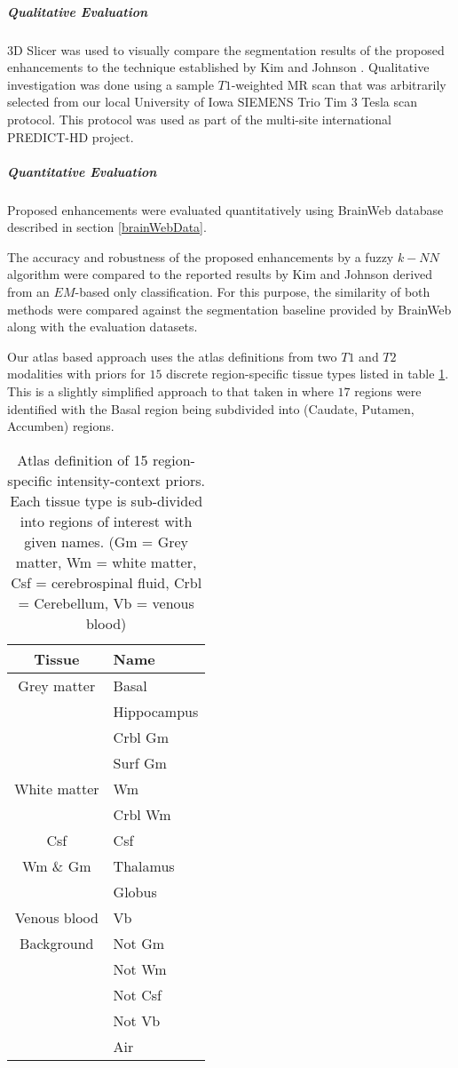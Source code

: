 \subparagraph{Qualitative Evaluation} %

3D Slicer \cite{slicer_paper} was used to visually compare the segmentation results of the proposed enhancements to the technique established by Kim and Johnson \cite{Kim2013}. 
Qualitative investigation was done using a sample $T1$-weighted MR scan that was arbitrarily selected from our local University of Iowa SIEMENS Trio Tim $3$ Tesla scan protocol.  This protocol was used as part of the multi-site international PREDICT-HD \cite{PREDICTHD} project.

\subparagraph{Quantitative Evaluation} %

Proposed enhancements were evaluated quantitatively using BrainWeb database described in section \ref{brainWebData}.

The accuracy and robustness of the proposed enhancements by a fuzzy $k-NN$ algorithm were compared to the reported results by Kim and Johnson \cite{Kim2013} derived from an $EM$-based only classification. For this purpose, the similarity of both methods were compared against the segmentation baseline provided by BrainWeb along with the evaluation datasets.

Our atlas based approach uses the atlas definitions from two $T1$ and $T2$ modalities with priors for $15$ discrete region-specific tissue types listed in table \ref{tab:tissue_names}. This is a slightly simplified approach to that taken in \cite{Kim2013} where $17$ regions were identified with the Basal region being subdivided into (Caudate, Putamen, Accumben) regions.
\begin{table}
\centering
\caption{Atlas definition of 15 region-specific intensity-context priors. Each tissue type is sub-divided into regions of interest with given names. (Gm = Grey matter, Wm = white matter, Csf = cerebrospinal fluid, Crbl = Cerebellum, Vb = venous blood) }
\begin{tabular}{c|l}
\hline \hline
Tissue & Name \\
\hline
Grey matter & Basal \\
 & Hippocampus \\
 & Crbl Gm \\
 & Surf Gm \\ [0.6ex]
White matter & Wm \\
 & Crbl Wm \\ [0.6ex]
Csf & Csf \\ [0.6ex]
Wm \& Gm & Thalamus \\
 & Globus \\ [0.6ex]
Venous blood & Vb \\ [0.6ex]
Background & Not Gm \\
  & Not Wm \\
  & Not Csf \\
  & Not Vb \\
  & Air \\
\hline \hline
\end{tabular}
\label{tab:tissue_names}
\end{table}


